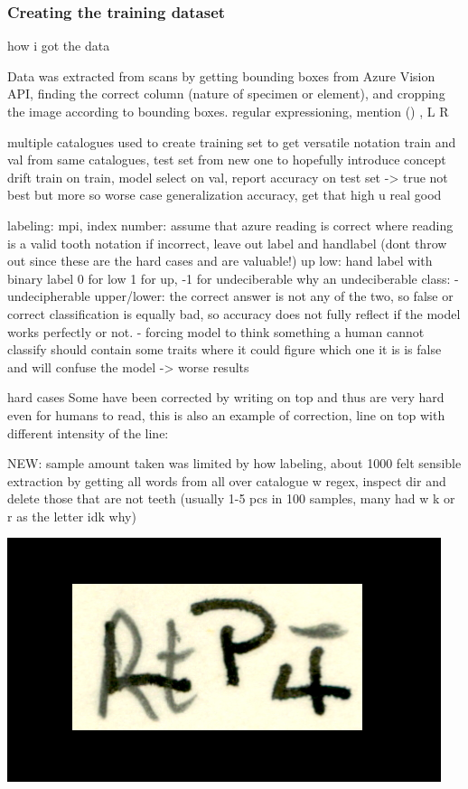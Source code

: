 \documentclass{article}
\begin{document}
\subsubsection{Creating the training dataset}

how i got the data

Data was extracted from scans by getting bounding boxes from Azure Vision API,
finding the correct column (nature of specimen or element), and cropping the image 
according to bounding boxes.
regular expressioning, mention () , L R

multiple catalogues used to create training set to get versatile notation
train and val from same catalogues, test set from new one to hopefully introduce concept drift
    train on train, model select on val, report accuracy on test set -> true not best but more so worse case generalization accuracy, get that high u real good

labeling:
mpi, index number: assume that azure reading is correct where reading is a valid tooth notation
if incorrect, leave out label and handlabel (dont throw out since these are the hard cases and are valuable!)
up low: hand label with binary label 0 for low 1 for up, -1 for undeciberable
    why an undeciberable class:
    - undecipherable upper/lower: the correct answer is not any of the two, so false or correct classification is equally bad, so accuracy does not fully reflect if the model works perfectly or not.
    - forcing model to think something a human cannot classify should contain some traits where it could figure which one it is is false and will confuse the model -> worse results

hard cases
Some have been corrected by writing on top and thus are very hard 
even for humans to read, this is also an example of correction, line on top with different
intensity of the line: 

NEW:
sample amount taken was limited by how labeling, about 1000 felt sensible
extraction by getting all words from all over catalogue w regex, inspect dir 
and delete those that are not teeth (usually 1-5 pcs in 100 samples, many had w k or r as the letter idk why)

\includegraphics*[scale=0.2]{../images/superambiguous_data_sample.png}
\end{document}
